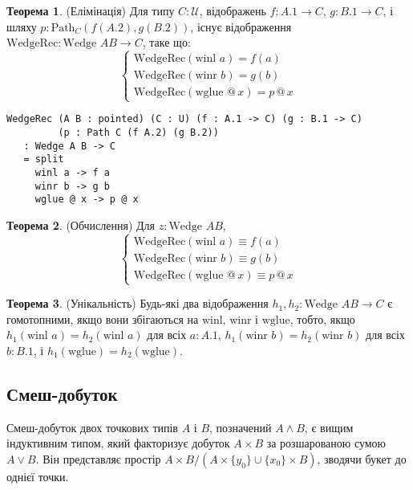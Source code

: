 \documentclass{article}
\theoremstyle{definition}
\newtheorem{theorem}{Теорема}
\begin{document}
\begin{theorem} (Елімінація)
Для типу \( C : \mathcal{U} \), відображень \( f : A.1 \to C \), \( g : B.1 \to C \), і шляху \( p : \text{Path}_C (f (A.2), g (B.2)) \), існує відображення \( \text{WedgeRec} : \text{Wedge } A B \to C \), таке що:
\[
\begin{cases}
\text{WedgeRec}(\text{winl } a) = f(a) \\
\text{WedgeRec}(\text{winr } b) = g(b) \\
\text{WedgeRec}(\text{wglue } @ \, x) = p \, @ \, x
\end{cases}
\]
\begin{lstlisting}
WedgeRec (A B : pointed) (C : U) (f : A.1 -> C) (g : B.1 -> C)
         (p : Path C (f A.2) (g B.2))
   : Wedge A B -> C
   = split
     winl a -> f a
     winr b -> g b
     wglue @ x -> p @ x
\end{lstlisting}
\end{theorem}

\begin{theorem} (Обчислення)
Для \( z : \text{Wedge } A B \),
\[
\begin{cases}
\text{WedgeRec}(\text{winl } a) \equiv f(a) \\
\text{WedgeRec}(\text{winr } b) \equiv g(b) \\
\text{WedgeRec}(\text{wglue } @ \, x) \equiv p \, @ \, x
\end{cases}
\]
\end{theorem}

\begin{theorem} (Унікальність)
Будь-які два відображення \( h_1, h_2 : \text{Wedge } A B \to C \) є гомотопними, якщо
вони збігаються на \( \text{winl} \), \( \text{winr} \) і \( \text{wglue} \),
тобто, якщо \( h_1(\text{winl } a) = h_2(\text{winl } a) \) для
всіх \( a : A.1 \), \( h_1(\text{winr } b) = h_2(\text{winr } b) \) для
всіх \( b : B.1 \), і \( h_1(\text{wglue}) = h_2(\text{wglue}) \).
\end{theorem}

\newpage
\subsection{Смеш-добуток}
Смеш-добуток двох точкових типів \( A \) і \( B \), позначений \( A \wedge B \),
є вищим індуктивним типом, який факторизує добуток \( A \times B \) за
розшарованою сумою \( A \vee B \). Він представляє простір \( A \times B / (A \times \{ y_0 \} \cup \{ x_0 \} \times B) \),
зводячи букет до однієї точки.
\end{document}

